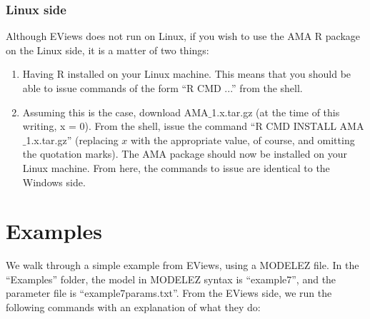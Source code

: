 \documentclass[11pt]{article}
\begin{document}
\subsubsection{Linux side}
Although EViews does not run on Linux, if you wish to use the AMA R package on the Linux side, it is a matter of two things: \begin{enumerate} 
\item Having R installed on your Linux machine.  This means that you should be able to issue commands of the form ``R CMD ...'' from the shell.
\item Assuming this is the case, download AMA$\_$1.x.tar.gz (at the time of this writing, x = 0).  From the shell, issue the command ``R CMD INSTALL AMA$\_$1.x.tar.gz'' (replacing $x$ with the appropriate value, of course, and omitting the quotation marks).  The AMA package should now be installed on your Linux machine.  From here, the commands to issue are identical to the Windows side. 
\end{enumerate} 

\section{Examples}
We walk through a simple example from EViews, using a MODELEZ file.  In the ``Examples'' folder, the model in MODELEZ syntax is ``example7'', and the parameter file is ``example7params.txt''.  From the EViews side, we run the following commands with an explanation of what they do: \\
\end{document}
